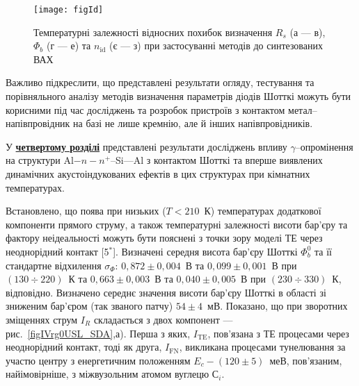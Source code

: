 \begin{figure}
\center
\texttt{[image: figId]}%
\caption{\label{figId}
Температурні залежності відносних похибок визначення $R_s$ (а --- в), $\Phi_b$ (г --- е) та $n_\mathrm{id}$ (є --- з) при застосуванні методів до синтезованих ВАХ
}
\end{figure}




Важливо підкреслити, що представлені результати огляду, тестування та порівняльного аналізу методів визначення параметрів діодів Шотткі можуть бути корисними під час досліджень та розробок пристроїв з контактом метал--напівпровідник на базі не лише кремнію, але й інших напівпровідників.


У  \underline{\textbf{четвертому розділі}} представлені результати досліджень
впливу $\gamma$--опромінення на структури Al$-n-n^+$--Si---Al з контактом Шотткі та
вперше виявлених динамічних акустоіндукованих ефектів в цих структурах при кімнатних температурах.

Встановлено, що поява при низьких ($T<210$~К) температурах додаткової компоненти прямого струму,
а також температурні залежності висоти бар'єру та фактору неідеальності можуть бути пояснені
з точки зору моделі ТЕ через неоднорідний контакт
[5$^*$].
%
       Визначені середня висота бар'єру Шотткі $\Phi_b^0$ та її стандартне відхилення $\sigma_{\Phi}$:
       $0,872\pm0,004$~В та $0,099\pm0,001$~В при $(130\div220)$~К та
       $0,663\pm0,003$~В та $0,040\pm0,005$~В при $(230\div330)$~К, відповідно.
Визначено середнє значення висоти бар'єру Шотткі в області зі зниженим бар'єром (так званого патчу) $54\pm4$~мВ.
Показано, що при зворотних зміщеннях струм $I_R$ складається з двох компонент --- рис.~\ref{figIVrg0USL_SDA},а).
Перша з яких, $I_\mathrm{TE}$, пов'язана з ТЕ процесами через неоднорідний контакт,
тоді як друга,
$I_\mathrm{FN}$, викликана процесами тунелювання за участю
центру з енергетичним положенням $E_c-(120\pm5)$~меВ, пов'язаним, найімовірніше, з міжвузольним атомом вуглецю С$_i$.


